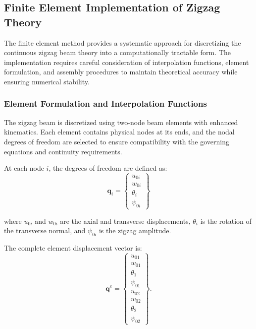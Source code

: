 \documentclass[12pt,a4paper]{report}
\begin{document}
\subsection{Finite Element Implementation of Zigzag Theory}

The finite element method provides a systematic approach for discretizing the continuous zigzag beam theory into a computationally tractable form. The implementation requires careful consideration of interpolation functions, element formulation, and assembly procedures to maintain theoretical accuracy while ensuring numerical stability.

\subsubsection*{Element Formulation and Interpolation Functions}

The zigzag beam is discretized using two-node beam elements with enhanced kinematics. Each element contains physical nodes at its ends, and the nodal degrees of freedom are selected to ensure compatibility with the governing equations and continuity requirements.

At each node $i$, the degrees of freedom are defined as:
\begin{equation}
    \mathbf{q}_i = \begin{Bmatrix} u_{0i} \\ w_{0i} \\ \theta_i \\ \psi_{0i} \end{Bmatrix}
\end{equation}

where $u_{0i}$ and $w_{0i}$ are the axial and transverse displacements, $\theta_i$ is the rotation of the transverse normal, and $\psi_{0i}$ is the zigzag amplitude.

The complete element displacement vector is:
\begin{equation}
    \mathbf{q}^e = \begin{Bmatrix} u_{01} \\ w_{01} \\ \theta_1 \\ \psi_{01} \\ u_{02} \\ w_{02} \\ \theta_2 \\ \psi_{02} \end{Bmatrix}.
\end{equation}
\end{document}
